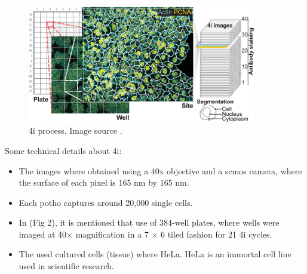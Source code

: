 
\begin{figure}[htb]
  \centering
  \includegraphics[width=100mm]{./Sections/Images/plate-well.png}
  \caption{\Acrlong{4i} process. Image source \cite{Guteaar7042}.}
  \label{fig:4i}
\end{figure}

Some technical details about \gls{4i}:
\begin{itemize}
  \item The images where obtained using a 40x objective and a \gls{scmos} camera, where the surface of each pixel is 165 nm by 165 nm.
  \item Each potho captures around 20,000 single cells.
  \item In \cite{Guteaar7042} (Fig 2), it is mentioned that use of 384-well plates, where wells were imaged at 40× magnification in a 7 × 6 tiled fashion for 21 4i cycles.
  \item The used cultured cells (tissue) where HeLa. HeLa is an immortal cell line used in scientific research.
\end{itemize}

